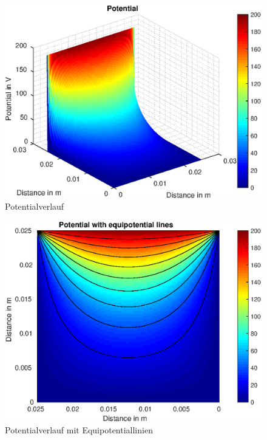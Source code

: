 \begin{figure}[H]
	\centering
	\includegraphics[scale=1]{pics/Bsp_1_a/fig_1.eps}
	\caption{Potentialverlauf}
\end{figure}

\begin{figure}[H]
	\centering
	\includegraphics[scale=1]{pics/Bsp_1_a/fig_2.eps}
	\caption{Potentialverlauf mit Equipotentiallinien}
\end{figure}

